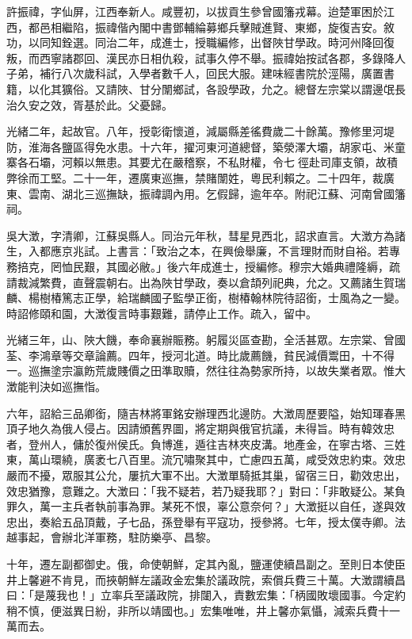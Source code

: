 \begin{pinyinscope}
許振禕，字仙屏，江西奉新人。咸豐初，以拔貢生參曾國籓戎幕。迨楚軍困於江西，都邑相繼陷，振禕偕內閣中書鄧輔綸募鄉兵擊賊進賢、東鄉，旋復吉安。敘功，以同知銓選。同治二年，成進士，授職編修，出督陜甘學政。時河州降回復叛，而西寧諸郡回、漢民亦日相仇殺，試事久停不舉。振禕始按試各郡，多錄降人子弟，補行八次歲科試，入學者數千人，回民大服。建味經書院於涇陽，廣置書籍，以化其獷俗。又請陜、甘分闈鄉試，各設學政，允之。總督左宗棠以謂邊氓長治久安之效，胥基於此。父憂歸。

光緒二年，起故官。八年，授彰衛懷道，減屬縣差徭費歲二十餘萬。豫修里河堤防，淮海各鹽區得免水患。十六年，擢河東河道總督，築滎澤大壩，胡家屯、米童寨各石壩，河賴以無患。其要尤在嚴稽察，不私財權，令七徑赴司庫支領，故積弊徐而工堅。二十一年，遷廣東巡撫，禁賭闈姓，粵民利賴之。二十四年，裁廣東、雲南、湖北三巡撫缺，振禕調內用。乞假歸，逾年卒。附祀江蘇、河南曾國籓祠。

吳大澂，字清卿，江蘇吳縣人。同治元年秋，彗星見西北，詔求直言。大澂方為諸生，入都應京兆試。上書言：「致治之本，在興儉舉廉，不言理財而財自裕。若專務掊克，罔恤民艱，其國必敝。」後六年成進士，授編修。穆宗大婚典禮隆縟，疏請裁減繁費，直聲震朝右。出為陜甘學政，奏以倉頡列祀典，允之。又薦諸生賀瑞麟、楊樹椿篤志正學，給瑞麟國子監學正銜，樹椿翰林院待詔銜，士風為之一變。時詔修頤和園，大澂復言時事艱難，請停止工作。疏入，留中。

光緒三年，山、陜大饑，奉命襄辦賑務。躬履災區查勘，全活甚眾。左宗棠、曾國荃、李鴻章等交章論薦。四年，授河北道。時比歲薦饑，貧民減價鬻田，十不得一。巡撫塗宗瀛飭荒歲賤價之田準取贖，然往往為勢家所持，以故失業者眾。惟大澂能判決如巡撫恉。

六年，詔給三品卿銜，隨吉林將軍銘安辦理西北邊防。大澂周歷要隘，始知琿春黑頂子地久為俄人侵占。因請頒舊界圖，將定期與俄官抗議，未得旨。時有韓效忠者，登州人，傭於復州侯氏。負博進，遁往吉林夾皮溝。地產金，在寧古塔、三姓東，萬山環繞，廣袤七八百里。流冗嘯聚其中，亡慮四五萬，咸受效忠約束。效忠嚴而不擾，眾服其公允，屢抗大軍不出。大澂單騎抵其巢，留宿三日，勸效忠出，效忠猶豫，意難之。大澂曰：「我不疑若，若乃疑我耶？」對曰：「非敢疑公。某負罪久，萬一主兵者執前事為罪。某死不恨，辜公意奈何？」大澂挺以自任，遂與效忠出，奏給五品頂戴，子七品，孫登舉有平寇功，授參將。七年，授太僕寺卿。法越事起，會辦北洋軍務，駐防樂亭、昌黎。

十年，遷左副都御史。俄，命使朝鮮，定其內亂，鹽運使續昌副之。至則日本使臣井上馨避不肯見，而挾朝鮮左議政金宏集於議政院，索償兵費三十萬。大澂謂續昌曰：「是蔑我也！」立率兵至議政院，排闥入，責數宏集：「柄國敗壞國事。今定約稍不慎，便滋異日紛，非所以靖國也。」宏集唯唯，井上馨亦氣懾，減索兵費十一萬而去。


\end{pinyinscope}
